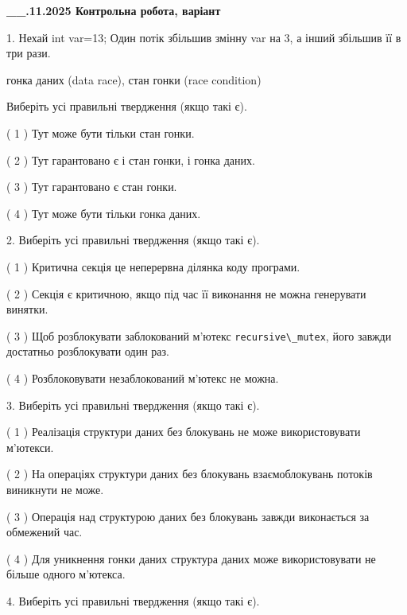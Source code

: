 \documentclass[12pt, ukrainian]{article}
\def\code#1{\Verb!#1!}
\begin{document}
\newpage
\begin {large}

\textbf{\_\_.11.2025 Контрольна робота, варіант  }\par


{
1. Нехай int var=13; Один потік збільшив змінну var на 3, а інший збільшив її в три рази.

гонка даних (data race), стан гонки (race condition)

Виберіть усі правильні твердження (якщо такі є).\par
\vspace{2mm}
( 1 ) Тут може бути тільки стан гонки.%

( 2 ) Тут гарантовано є і стан гонки, і гонка даних.%

( 3 ) Тут гарантовано є стан гонки.%

( 4 ) Тут може бути тільки гонка даних.%


2. Виберіть усі правильні твердження (якщо такі є).\par
\vspace{2mm}

( 1 ) Критична секція це неперервна ділянка коду програми.%

( 2 ) Секція є критичною, якщо під час її виконання не можна генерувати винятки.%

( 3 ) Щоб розблокувати заблокований м’ютекс \code{recursive\_mutex}, його завжди достатньо розблокувати один раз.%

( 4 ) Розблоковувати незаблокований м’ютекс не можна.%


3. Виберіть усі правильні твердження (якщо такі є).\par
\vspace{2mm}

( 1 ) Реалізація структури даних без блокувань не може використовувати м’ютекси.%

( 2 ) На операціях структури даних без блокувань взаємоблокувань потоків виникнути не може.%

( 3 ) Операція над структурою даних без блокувань завжди виконається за обмежений час.%

( 4 ) Для уникнення гонки даних структура даних може використовувати не більше одного м’ютекса.%


4. Виберіть усі правильні твердження (якщо такі є).\par
\vspace{2mm}

}
\end{large}
\end{document}
